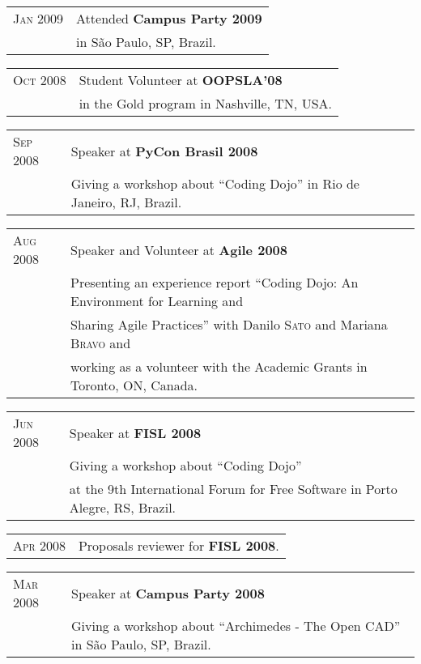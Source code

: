 \documentclass[letter,10pt]{article}
\begin{document}
\begin{tabular}{p{2.5cm}l}
  \textsc{Jan 2009} & Attended \textbf{Campus Party 2009}\\
  &in São Paulo, SP, Brazil.\\
\end{tabular}

\begin{tabular}{p{2.5cm}l}
  \textsc{Oct 2008} & Student Volunteer at \textbf{OOPSLA'08}\\
  & in the Gold program in Nashville, TN, USA.\\
\end{tabular}

\begin{tabular}{p{2.5cm}l}
  \textsc{Sep 2008} & Speaker at \textbf{PyCon Brasil 2008}\\
  &Giving a workshop about ``Coding Dojo'' in Rio de Janeiro, RJ, Brazil.\\
\end{tabular}

\begin{tabular}{p{2.5cm}l}
  \textsc{Aug 2008} & Speaker and Volunteer at \textbf{Agile 2008}\\
  &Presenting an experience report ``Coding Dojo: An Environment for
  Learning and\\
  & Sharing Agile Practices'' with Danilo \textsc{Sato} and Mariana \textsc{Bravo} and\\
  & working as a volunteer with the Academic Grants in Toronto, ON, Canada.\\
\end{tabular}

\begin{tabular}{p{2.5cm}l}
  \textsc{Jun 2008} & Speaker at \textbf{FISL 2008}\\
  &Giving a workshop about ``Coding Dojo''\\
  & at the 9th International Forum for Free Software in Porto
  Alegre, RS, Brazil.\\
\end{tabular}

\begin{tabular}{p{2.5cm}l}
  \textsc{Apr 2008} & Proposals reviewer for \textbf{FISL 2008}.\\
\end{tabular}

\begin{tabular}{p{2.5cm}l}
  \textsc{Mar 2008} & Speaker at \textbf{Campus Party 2008}\\
  &Giving a workshop about ``Archimedes - The Open CAD'' in São Paulo, SP, Brazil.\\
\end{tabular}
\end{document}
